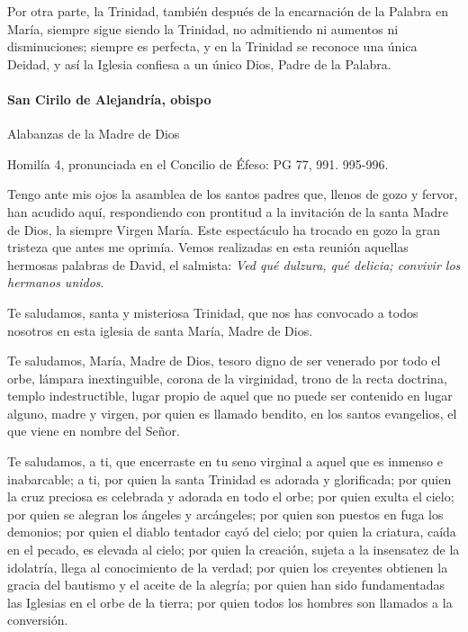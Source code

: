 \documentclass[]{article}
\let\oldparagraph\paragraph
\renewcommand{\paragraph}[1]{\oldparagraph{#1}\mbox{}}
\begin{document}
Por otra parte, la Trinidad, también después de la encarnación de la
Palabra en María, siempre sigue siendo la Trinidad, no admitiendo ni
aumentos ni disminuciones; siempre es perfecta, y en la Trinidad se
reconoce una única Deidad, y así la Iglesia confiesa a un único Dios,
Padre de la Palabra.

\paragraph{San Cirilo de Alejandría, obispo
}\label{san-cirilo-de-alejandruxeda-obispo}

Alabanzas de la Madre de Dios

Homilía 4, pronunciada en el Concilio de Éfeso: PG 77, 991. 995-996.

Tengo ante mis ojos la asamblea de los santos padres que, llenos de gozo
y fervor, han acudido aquí, respondiendo con prontitud a la invitación
de la santa Madre de Dios, la siempre Virgen María. Este espectáculo ha
trocado en gozo la gran tristeza que antes me oprimía. Vemos realizadas
en esta reunión aquellas hermosas palabras de David, el salmista:
\emph{Ved qué dulzura, qué delicia; convivir los hermanos unidos}.

Te saludamos, santa y misteriosa Trinidad, que nos has convocado a todos
nosotros en esta iglesia de santa María, Madre de Dios.

Te saludamos, María, Madre de Dios, tesoro digno de ser venerado por
todo el orbe, lámpara inextinguible, corona de la virginidad, trono de
la recta doctrina, templo indestructible, lugar propio de aquel que no
puede ser contenido en lugar alguno, madre y virgen, por quien es
llamado bendito, en los santos evangelios, el que viene en nombre del
Señor.

Te saludamos, a ti, que encerraste en tu seno virginal a aquel que es
inmenso e inabarcable; a ti, por quien la santa Trinidad es adorada y
glorificada; por quien la cruz preciosa es celebrada y adorada en todo
el orbe; por quien exulta el cielo; por quien se alegran los ángeles y
arcángeles; por quien son puestos en fuga los demonios; por quien el
diablo tentador cayó del cielo; por quien la criatura, caída en el
pecado, es elevada al cielo; por quien la creación, sujeta a la
insensatez de la idolatría, llega al conocimiento de la verdad; por
quien los creyentes obtienen la gracia del bautismo y el aceite de la
alegría; por quien han sido fundamentadas las Iglesias en el orbe de la
tierra; por quien todos los hombres son llamados a la conversión.
\end{document}
